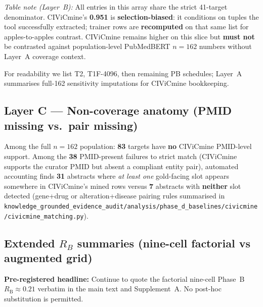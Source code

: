 \medskip
\noindent\textit{Table note (Layer~B):} All entries in this array share the strict
41-target denominator. CIViCmine's \textbf{0.951} is \textbf{selection-biased}:
it conditions on tuples the tool successfully extracted; trainer rows are
\textbf{recomputed} on that same list for apples-to-apples contrast. CIViCmine
remains higher on this slice but \textbf{must not} be contrasted against
population-level PubMedBERT $n=162$ numbers without Layer~A coverage context.

\noindent For readability we list T2, T1F-4096, then remaining PB schedules;
Layer~A summarises full-162 sensitivity imputations for CIViCmine bookkeeping.

\subsection{Layer C --- Non-coverage anatomy (PMID missing vs.\ pair missing)}%
\label{supp:civicmine-layer-c}

Among the full $n=162$ population: \textbf{83} targets have \textbf{no} CIViCmine
PMID-level support. Among the \textbf{38} PMID-present failures to strict match
(CIViCmine supports the curator PMID but absent a compliant entity pair),
automated accounting finds \textbf{31} abstracts where \emph{at least one}
gold-facing slot appears somewhere in CIViCmine's mined rows versus \textbf{7}
abstracts with \textbf{neither} slot detected (gene+drug or alteration+disease
pairing rules summarised in
\texttt{knowledge\_grounded\_evidence\_audit/analysis/phase\_d\_baselines/civicmine/civicmine\_matching.py}).

\subsection{Extended $R_B$ summaries (nine-cell factorial vs augmented grid)}%
\label{supp:phase-d-rb-extensions}

\textbf{Pre-registered headline:} Continue to quote the factorial nine-cell Phase~B
$R_{\mathrm{B}} \approx 0.21$ verbatim in the main text and Supplement~A. No post-hoc substitution is permitted.

